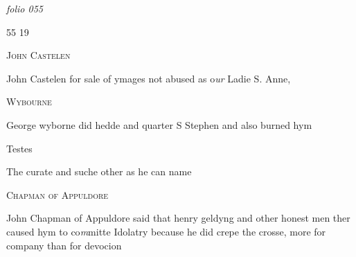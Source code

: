 \documentclass[12pt, a4paper]{book}
\begin{document}
\textit{folio 055}


\begin{flushright}{\color{Mahogany}55} 19\end{flushright}
 

	
				\begin{center}  {\scshape John Castelen}  \end{center}
			
	
		
				\marginpar[\vspace{0.5cm}{\textcolor{Gray}{Images}}]{}
			
		
		\ifthenelse{\isodd{\thepage}}
		{\reversemarginpar}
		{\normalmarginpar}
		John Castelen for sale of ymages not abused
  as o\textit{ur} Ladie S. Anne,
 

               
               	
				\begin{center}  {\scshape Wybourne}  \end{center}
			
               	
               		
				\marginpar[\vspace{0.5cm}{\textcolor{Gray}{Images}}]{}
			
               		
		\ifthenelse{\isodd{\thepage}}
		{\reversemarginpar}
		{\normalmarginpar}
		George wyborne did hedde and quarter S Stephen
 and also burned hym
               	
               		
               			Testes
               			
		\ifthenelse{\isodd{\thepage}}
		{\reversemarginpar}
		{\normalmarginpar}
		The curate and suche other as he can
 name
               	
 

               
               	
				\begin{center}  {\scshape Chapman of Appuldore}  \end{center}
			
               	
               		
				\marginpar[\vspace{0.5cm}{\textcolor{Gray}{ceremonies}}]{}
			
               		
		\ifthenelse{\isodd{\thepage}}
		{\reversemarginpar}
		{\normalmarginpar}
		John Chapman of Appuldore said that henry geldyng
  and other honest men ther caused hym to co\textit{m}mitte Idolatry
 because he did crepe the crosse, more for company
 than for devocion
               		
\end{document}
